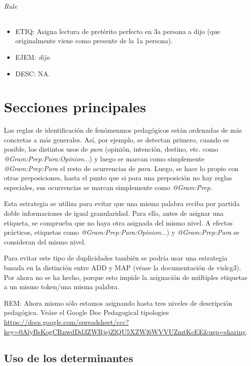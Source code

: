 \documentclass[11pt]{report}
\begin{document}
\paragraph*{Rule}
\begin{itemize}
\item ETIQ: Asigna lectura de pretérito perfecto en 3a persona a dijo (que originalmente viene como presente de la 1a persona).
\item EJEM: \emph{dijo}
\item DESC: NA.
\end{itemize}

\part{Secciones principales}
Las reglas de identificación de fenómenmos pedagógicos están ordenadas de más concretas a más generales. Así, por ejemplo, se detectan primero, cuando es posible, los distintos usos de \emph{para} (opinión, intención, destino, etc. como \emph{@Gram:Prep:Para:Opinion}...) y luego se marcan como simplemente \emph{@Gram:Prep:Para} el resto de ocurrencias de \emph{para}. Luego, se hace lo propio con otras preposiciones, hasta el punto que si para una preposición no hay reglas especiales, sus ocurrencias se marcan simplemente como \emph{@Gram:Prep}.

Esta estrategia se utiliza para evitar que una misma palabra reciba por partida doble informaciones de igual granularidad. Para ello, antes de asignar una etiqueta, se comprueba que no haya otra asignada del mismo nivel. A efectos prácticos, etiquetas como \emph{@Gram:Prep:Para:Opinion}...) y \emph{@Gram:Prep:Para} se consideran del mismo nivel.

Para evitar este tipo de duplicidades también se podría usar una estrategia basada en la distinción entre ADD y MAP (véase la documentación de vislcg3). Por ahora no se ha hecho, porque esto impide la asignación de múltiples etiquetas a un mismo token/una misma palabra.

REM: Ahora mismo sólo estamos asignando hasta tres niveles de descripción pedagógica. Veáse el Google Doc Pedagogical tipologies \url{https://docs.google.com/spreadsheet/ccc?key=0AlyBsKogCRnwdDd3ZWRjejZlQU5XZWl6WVVUZmtKcEE&usp=sharing}.
\chapter{Uso de los determinantes}
\end{document}

